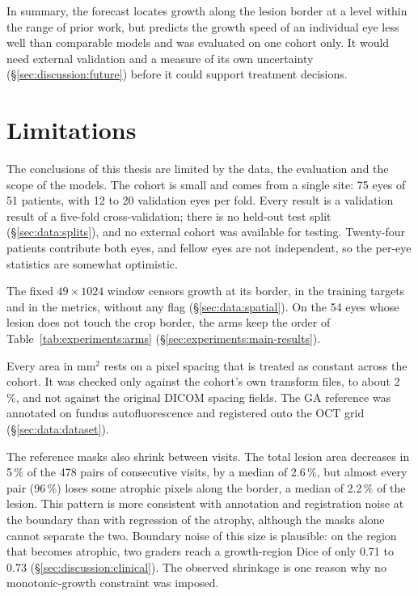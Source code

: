 In summary, the forecast locates growth along the lesion border at a level
within the range of prior work, but predicts the growth speed of an
individual eye less well than comparable models and was evaluated on one
cohort only. It would need external validation and a measure of its own
uncertainty (\S\ref{sec:discussion:future}) before it could support
treatment decisions.


\section{Limitations}
\label{sec:discussion:limitations}

The conclusions of this thesis are limited by the data, the evaluation and
the scope of the models. The cohort is small and comes from a single site:
75 eyes of 51 patients, with 12 to 20 validation eyes per fold. Every
result is a validation result of a five-fold cross-validation; there is no
held-out test split (\S\ref{sec:data:splits}), and no external cohort was
available for testing. Twenty-four patients contribute both eyes, and
fellow eyes are not independent, so the per-eye statistics are somewhat
optimistic.

The fixed $49 \times 1024$ window censors growth at its border, in the
training targets and in the metrics, without any flag
(\S\ref{sec:data:spatial}). On the 54 eyes whose
lesion does not touch the crop border, the arms keep the order of
Table~\ref{tab:experiments:arms} (\S\ref{sec:experiments:main-results}).

Every area in mm$^2$ rests on a pixel spacing that is treated as constant
across the cohort. It was checked only against the cohort's own
transform files, to about 2\,\%, and not against the original DICOM
spacing fields. The GA reference was annotated on fundus
autofluorescence and registered onto the OCT grid (\S\ref{sec:data:dataset}).

The reference masks also shrink between visits. The total
lesion area decreases in 5\,\% of the 478 pairs of consecutive visits, by a
median of 2.6\,\%, but almost every pair (96\,\%) loses some atrophic
pixels along the border, a median of 2.2\,\% of the lesion. This pattern is
more consistent with annotation and registration noise at the boundary
than with regression of the atrophy, although the masks alone cannot
separate the two. Boundary noise of this size is plausible: on the region
that becomes atrophic, two graders reach a growth-region Dice of only 0.71
to 0.73 (\S\ref{sec:discussion:clinical}). The observed shrinkage is one reason why no
monotonic-growth constraint was imposed.

